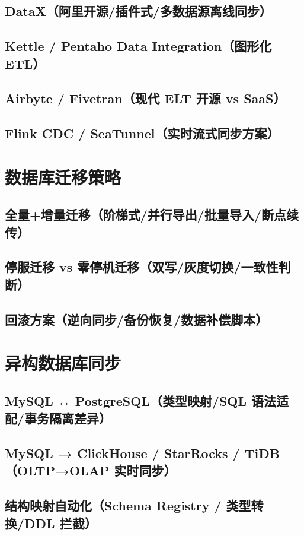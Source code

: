 \documentclass[12pt,UTF8]{ctexbook}
\begin{document}
    \subsection{DataX（阿里开源/插件式/多数据源离线同步）}
    \subsection{Kettle / Pentaho Data Integration（图形化 ETL）}
    \subsection{Airbyte / Fivetran（现代 ELT 开源 vs SaaS）}
    \subsection{Flink CDC / SeaTunnel（实时流式同步方案）}

  \section{数据库迁移策略}
    \subsection{全量+增量迁移（阶梯式/并行导出/批量导入/断点续传）}
    \subsection{停服迁移 vs 零停机迁移（双写/灰度切换/一致性判断）}
    \subsection{回滚方案（逆向同步/备份恢复/数据补偿脚本）}

  \section{异构数据库同步}
    \subsection{MySQL ↔ PostgreSQL（类型映射/SQL 语法适配/事务隔离差异）}
    \subsection{MySQL → ClickHouse / StarRocks / TiDB（OLTP→OLAP 实时同步）}
    \subsection{结构映射自动化（Schema Registry / 类型转换/DDL 拦截）}
\end{document}
